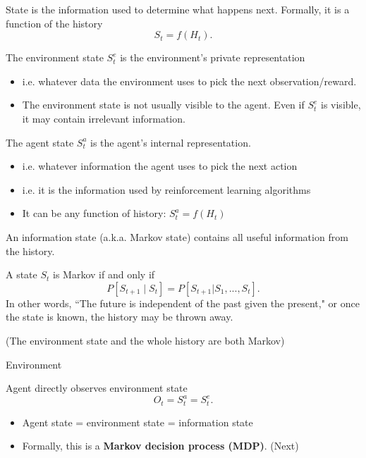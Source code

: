 \documentclass[english]{article}
\begin{document}
\begin{definition}[State]
State is the information used to determine what happens next. Formally, it is a function of the history
\[ S_t = f(H_t). \]
\end{definition}

\begin{definition}
The environment state $S^e_t$
is the environment's private representation
\begin{itemize}
    \item i.e. whatever data the
environment uses to pick the
next observation/reward.
    \item The environment state is not
usually visible to the agent.
Even if $S^e_t$
is visible, it may
contain irrelevant
information.
\end{itemize}
\end{definition}

\begin{definition}
The agent state $S^a_t$
is the
agent's internal
representation.
\begin{itemize}
    \item i.e. whatever information
the agent uses to pick the
next action
    \item i.e. it is the information
used by reinforcement
learning algorithms
    \item It can be any function of
history: $S^a_t= f (H_t)$
\end{itemize}
\end{definition}

\begin{definition}
    An information state (a.k.a. Markov state) contains all useful
information from the history.
\end{definition}

\begin{definition}
A state $S_t$ is Markov if and only if
\[ P[S_{t+1} \mid S_t] = P[S_{t+1} | S_1, ..., S_t]. \]
In other words, ``The future is independent of the past given the present," or once the state is known, the history may be thrown away.
\end{definition}
(The environment state and the whole history are both Markov)


\item {Environment}
\begin{definition}
Agent directly observes environment state
\[ O_t = S^a_t = S^e_t. \]
\begin{itemize}
    \item Agent state = environment
state = information state
    \item Formally, this is a \textbf{Markov
decision process (MDP)}. (Next)
\end{itemize}
\end{definition}
\end{document}
